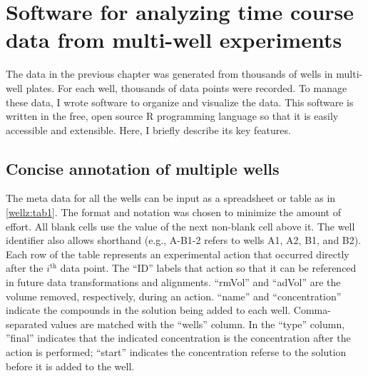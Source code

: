 \chapter[Multi-well time course analyses]{Software for 
analyzing time course data from multi-well experiments}\label{chapter:wellz}

The data in the previous chapter was generated from thousands of wells
in multi-well plates. For each well, thousands of data points were recorded.
To manage these data, I wrote software to organize and visualize the data.
This software is written in the free, open source R programming language
so that it is easily accessible and extensible. Here, I briefly describe
its key features.


\section{Concise annotation of multiple wells}

The meta data for all the wells can be input as a spreadsheet or
table as in \autoref{wellz:tab1}. The format and notation was chosen
to minimize the amount of effort. All blank cells use the value
of the next non-blank cell above it. The well identifier also
allows shorthand (e.g., A-B1-2 refers to wells A1, A2, B1, and B2).
Each row of the table represents an experimental action that occurred
directly after the $i^{\text{th}}$ data point. The ``ID'' labels
that action so that it can be referenced in future data transformations and alignments.
``rmVol'' and ``adVol''
are the volume removed, respectively, during an action.
``name'' and ``concentration'' indicate the compounds in the solution
being added to each well. Comma-separated values are matched with the
``wells'' column. In the ``type'' column, ''final'' indicates that
the indicated concentration is the concentration after the action is
performed; ``start'' indicates the concentration referse to the solution
before it is added to the well.


